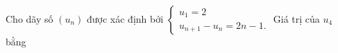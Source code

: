 \begin{ex}
Cho dãy số $(u_n)$ được xác định bởi $\begin{cases}u_1=2\\ u_{n+1}-u_n=2n-1.\end{cases}$ Giá trị của $u_4$ bằng
\end{ex}
